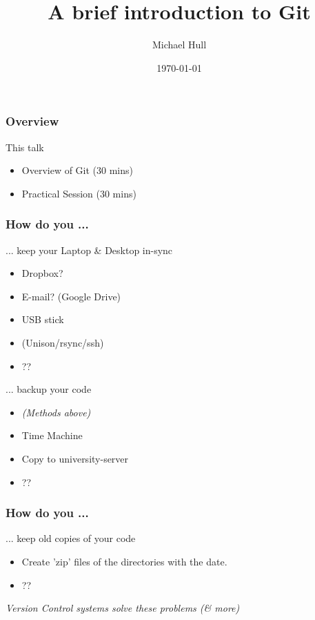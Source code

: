 \documentclass{beamer}
\title[A brief introduction to Git]{A brief introduction to Git}
\author{Michael Hull}
\institute[University of Edinburgh]
{
University of Edinburgh \\
\medskip
{\emph{mikehulluk@googlemail.com}}
}
\date{\today}
\begin{document}
%
\begin{frame}
\titlepage
\end{frame}
%



\begin{frame}
\frametitle{Overview}
\begin{block}
{This talk}
\begin{itemize}
\item Overview of Git (30 mins)
\item Practical Session (30 mins)
\end{itemize}
\end{block}
\end{frame}



\begin{frame}
\frametitle{How do you ...}

\begin{block}
{ ... keep your Laptop \& Desktop in-sync}
\begin{itemize}
\item Dropbox?
\item E-mail? (Google Drive)
\item USB stick
\item (Unison/rsync/ssh)
\item ??
\end{itemize}
\end{block}

\pause

\begin{block}
{... backup your code}
\begin{itemize}
\item \emph{(Methods above)} 
\item Time Machine 
\item Copy to university-server
\item ??
\end{itemize}
\end{block}

\end{frame}



\begin{frame}
\frametitle{How do you ...}
\begin{block}
{... keep old copies of your code}	
\begin{itemize}
\item Create 'zip' files of the directories with the date. 
\item ??
\end{itemize}
\end{block}

\pause

\begin{block}
{ \emph{Version Control systems solve these problems (\& more)}	}
\end{block}




\end{frame}
\end{document}

